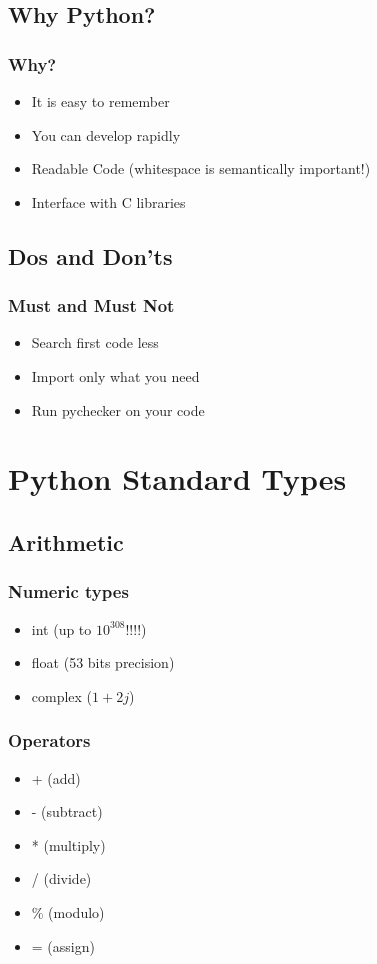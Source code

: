 \documentclass{beamer}
\begin{document}
\subsection{Why Python?}
\begin{frame}
	\frametitle{Why?}
	\begin{itemize}
	\item<1-> It is easy to remember
	\item<2-> You can develop rapidly
	\item<3-> Readable Code (whitespace is semantically important!)
	\item<4-> Interface with C libraries
	\end{itemize}
\end{frame}
\subsection{Dos and Don'ts}
\begin{frame}
	\frametitle{Must and Must Not}

\begin{itemize}
\item<1-> Search first code less
\item<2-> Import only what you need
\item<3-> Run pychecker on your code
\end{itemize}

\end{frame}

\section{Python Standard Types}
\subsection{Arithmetic}

\begin{frame}
\frametitle{Numeric types}
\begin{itemize}
\item<1-> int (up to $10^{308}$!!!!) 
\item<2-> float (53 bits precision)
\item<3-> complex ($1+2j$)
\end{itemize}
\end{frame}

\begin{frame}
\frametitle{Operators}
\begin{itemize}
\item<1-> + (add)
\item<2-> - (subtract)
\item<3-> * (multiply)
\item<4-> / (divide)
\item<5-> \% (modulo)
\item<6-> =	(assign)
\end{itemize}
\end{frame}
\end{document}
